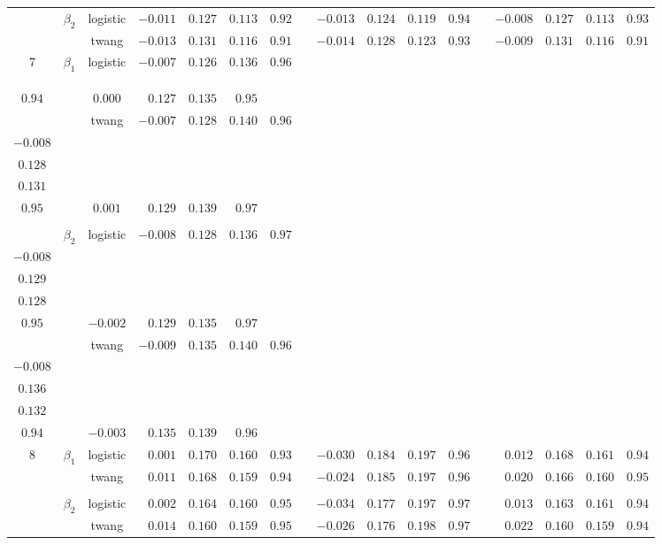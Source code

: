 \documentclass[11pt]{article}
\begin{document}
\begin{table}[h]
\begin{center}
\begin{tabular}{ccc rrrr c rrlc c rrrr}
&\multirow{2}{*}{$\beta_2$}&logistic  &$-0.011$&$0.127$&$0.113$&$0.92$&&$-0.013$&$0.124$&$0.119$&$0.94$&&$-0.008$&$0.127$&$0.113$&$0.93$\tabularnewline

&&twang 
&$-0.013$&$0.131$&$0.116$&$0.91$&&$-0.014$&$0.128$&$0.123$&$0.93$&&$ -0.009$&$0.131$&$0.116$&$0.91$\tabularnewline
\hline
\multirow{4}{*}{7}&\multirow{2}{*}{$\beta_1$} &logistic  &$-0.007$&$0.126$&$0.136$&$0.96$&& \Centerstack{$-0.012$\\$-0.008$}&\Centerstack{$0.128$\\$0.126$}&%
 \Centerstack{$0.120$\\$0.128$}$^*$ &\Centerstack{$0.83$\\$0.94$} &&$ 0.000$&$0.127$&$0.135$&$0.95$\tabularnewline

&&twang  &$-0.007$&$0.128$&$0.140$&$0.96$&& \Centerstack{$-0.012$\\$-0.008$}& \Centerstack{$0.129$\\$0.128$}& %
 \Centerstack{$0.122$\\$0.131$}$^*$& \Centerstack{$0.83$\\$0.95$} &&$ 0.001$&$0.129$&$0.139$&$0.97$\tabularnewline
\\[-1.5ex] 

&\multirow{2}{*}{$\beta_2$}&logistic &$-0.008$&$0.128$&$0.136$&$0.97$&& \Centerstack{$-0.014$\\$-0.008$}& \Centerstack{$0.131$\\$0.129$}&%
 \Centerstack{$0.124$\\$0.128$}$^*$&\Centerstack{$0.82$\\$0.95$}&&$-0.002$&$0.129$&$0.135$&$0.97$\tabularnewline

&&twang &$-0.009$&$0.135$&$0.140$&$0.96$&& \Centerstack{$-0.014$\\$-0.008$}& \Centerstack{$0.138$\\$0.136$}&%
 \Centerstack{$0.126$\\$0.132$}$^*$& \Centerstack{$0.81$\\$0.94$}&&$-0.003$&$ 0.135$&$0.139$&$0.96$
\tabularnewline 
\hline
\multirow{4}{*}{8}&\multirow{2}{*}{$\beta_1$}&logistic  &$0.001$&$0.170$&$0.160$&$0.93$&&$-0.030$&$0.184$&$0.197$&$0.96$&&$ 0.012$&$0.168$&$0.161$&$0.94$\tabularnewline

&&twang &$0.011$&$0.168$&$0.159$&$0.94$&&$-0.024$&$0.185$&$0.197$&$0.96$&&$0.020$&$0.166$&$ 0.160$&$0.95$\tabularnewline
 \\[-1.5ex] 

&\multirow{2}{*}{$\beta_2$}&logistic  
&$0.002$&$0.164$&$0.160$&$0.95$&&$-0.034$&$0.177$&$0.197$&$0.97$&&$0.013$&$0.163$&$0.161$&$0.94$\tabularnewline

&&twang &$0.014$&$0.160$&$0.159$&$0.95$&&$-0.026$&$0.176$&$0.198$&$0.97$&&$0.022$&$0.160$&$0.159$&$0.94$\tabularnewline
\hline
\end{tabular}
\end{center}
\end{table}
\end{document}
